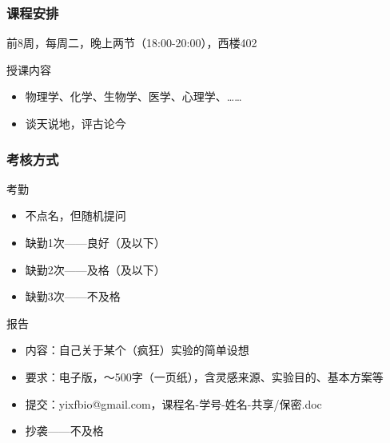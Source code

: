 \begin{frame}
  \frametitle{课程安排}
  \begin{center}
  \alert{前8周，每周二，晚上两节（18:00-20:00），西楼402}\\
  \vspace{0.2cm}
  \end{center}
  \begin{block}{授课内容}
    \begin{itemize}
      \item 物理学、化学、生物学、医学、心理学、……
      \item 谈天说地，评古论今
    \end{itemize}
  \end{block}
\end{frame}

\begin{frame}
  \frametitle{\alert{考核方式}}
  \begin{block}{考勤}
    \begin{itemize}
      \item 不点名，但随机提问
      \item 缺勤1次——良好（及以下）
      \item 缺勤2次——及格（及以下）
      \item 缺勤3次——不及格
    \end{itemize}
  \end{block}
  \pause
  \begin{block}{报告}
    \begin{itemize}
      \item 内容：自己关于某个（疯狂）实验的简单设想
      \item 要求：电子版，～500字（一页纸），含灵感来源、实验目的、基本方案等
      \item 提交：yixfbio@gmail.com，课程名-学号-姓名-共享/保密.doc
      \item 抄袭——不及格
    \end{itemize}
  \end{block}
\end{frame}

